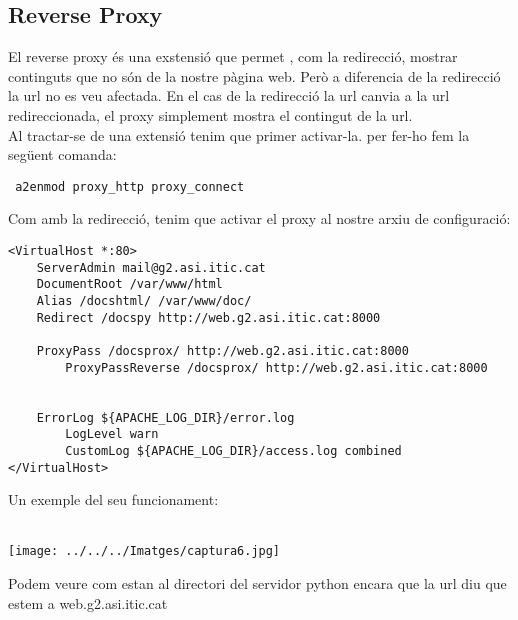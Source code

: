 \documentclass[11p]{article}
\begin{document}
\subsection{Reverse Proxy}
El reverse proxy és una exstensió que permet , com la redirecció, mostrar continguts que no són de la nostre pàgina web. Però a diferencia de la redirecció la url no es veu afectada. En el cas de la redirecció la url canvia a la url redireccionada, el proxy simplement mostra el contingut de la url.\\
Al tractar-se de una extensió tenim que primer activar-la. per fer-ho fem la següent comanda:
\begin{lstlisting}
 a2enmod proxy_http proxy_connect
\end{lstlisting}
Com amb la redirecció, tenim que activar el proxy al nostre arxiu de configuració:\\
\begin{lstlisting}
<VirtualHost *:80>
	ServerAdmin mail@g2.asi.itic.cat
	DocumentRoot /var/www/html     
	Alias /docshtml/ /var/www/doc/	
	Redirect /docspy http://web.g2.asi.itic.cat:8000 
	
	ProxyPass /docsprox/ http://web.g2.asi.itic.cat:8000
    	ProxyPassReverse /docsprox/ http://web.g2.asi.itic.cat:8000
	
	
	ErrorLog ${APACHE_LOG_DIR}/error.log
    	LogLevel warn
    	CustomLog ${APACHE_LOG_DIR}/access.log combined
</VirtualHost>
\end{lstlisting}
Un exemple del seu funcionament:\\\\
\centerline{\texttt{[image: ../../../Imatges/captura6.jpg]} }
Podem veure com estan al directori del servidor python encara que la url diu que estem a web.g2.asi.itic.cat
\end{document}

